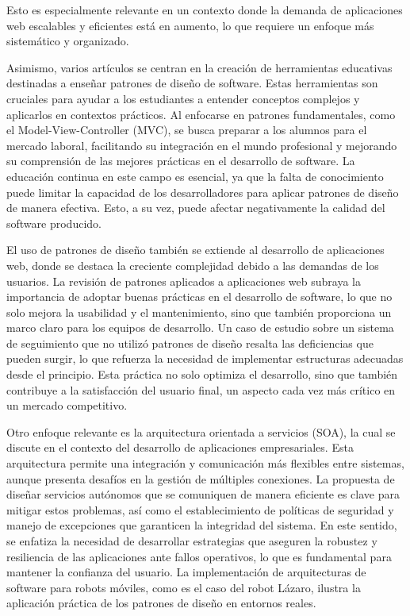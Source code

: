 \documentclass[twocolumn]{article}
\begin{document}
Esto es especialmente relevante en un contexto donde la demanda de aplicaciones web escalables y eficientes está en aumento, lo que requiere un enfoque más sistemático y organizado.

Asimismo, varios artículos se centran en la creación de herramientas educativas destinadas a enseñar patrones de diseño de software. Estas herramientas son cruciales para ayudar a los estudiantes a entender conceptos complejos y aplicarlos en contextos prácticos. Al enfocarse en patrones fundamentales, como el Model-View-Controller (MVC), se busca preparar a los alumnos para el mercado laboral, facilitando su integración en el mundo profesional y mejorando su comprensión de las mejores prácticas en el desarrollo de software. La educación continua en este campo es esencial, ya que la falta de conocimiento puede limitar la capacidad de los desarrolladores para aplicar patrones de diseño de manera efectiva. Esto, a su vez, puede afectar negativamente la calidad del software producido.

El uso de patrones de diseño también se extiende al desarrollo de aplicaciones web, donde se destaca la creciente complejidad debido a las demandas de los usuarios. La revisión de patrones aplicados a aplicaciones web subraya la importancia de adoptar buenas prácticas en el desarrollo de software, lo que no solo mejora la usabilidad y el mantenimiento, sino que también proporciona un marco claro para los equipos de desarrollo. Un caso de estudio sobre un sistema de seguimiento que no utilizó patrones de diseño resalta las deficiencias que pueden surgir, lo que refuerza la necesidad de implementar estructuras adecuadas desde el principio. Esta práctica no solo optimiza el desarrollo, sino que también contribuye a la satisfacción del usuario final, un aspecto cada vez más crítico en un mercado competitivo.

Otro enfoque relevante es la arquitectura orientada a servicios (SOA), la cual se discute en el contexto del desarrollo de aplicaciones empresariales. Esta arquitectura permite una integración y comunicación más flexibles entre sistemas, aunque presenta desafíos en la gestión de múltiples conexiones. La propuesta de diseñar servicios autónomos que se comuniquen de manera eficiente es clave para mitigar estos problemas, así como el establecimiento de políticas de seguridad y manejo de excepciones que garanticen la integridad del sistema. En este sentido, se enfatiza la necesidad de desarrollar estrategias que aseguren la robustez y resiliencia de las aplicaciones ante fallos operativos, lo que es fundamental para mantener la confianza del usuario.
La implementación de arquitecturas de software para robots móviles, como es el caso del robot Lázaro, ilustra la aplicación práctica de los patrones de diseño en entornos reales.
\end{document}
